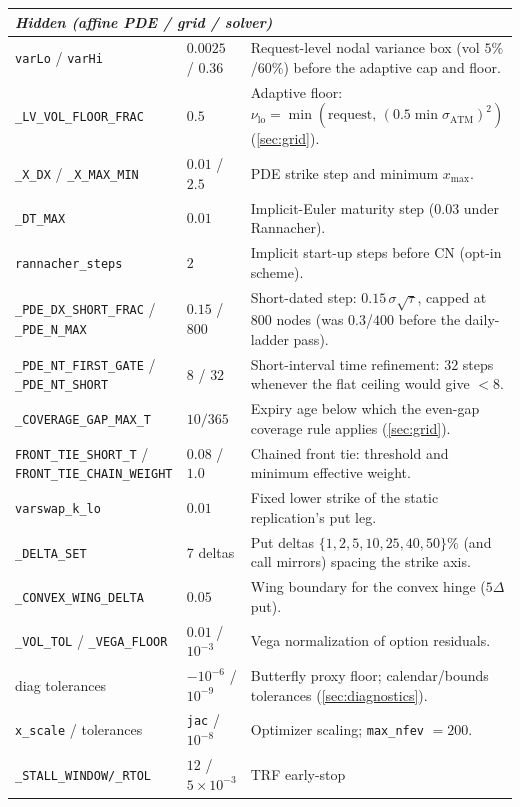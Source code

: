 \documentclass[11pt]{article}
\begin{document}
\begin{longtable}{p{}p{}p{}}
\midrule
\multicolumn{3}{l}{\emph{Hidden (affine PDE / grid / solver)}}\\ \midrule
\texttt{varLo} / \texttt{varHi} & $0.0025$ / $0.36$ & Request-level nodal
variance box (vol $5\%$/$60\%$) before the adaptive cap and floor.\\
\texttt{\_LV\_VOL\_FLOOR\_FRAC} & $0.5$ & Adaptive floor:
$\nu_{\mathrm{lo}}=\min(\text{request},\,(0.5\min\sigma_{\mathrm{ATM}})^{2})$
(\cref{sec:grid}).\\
\texttt{\_X\_DX} / \texttt{\_X\_MAX\_MIN} & $0.01$ / $2.5$ & PDE strike
step and minimum $x_{\max}$.\\
\texttt{\_DT\_MAX} & $0.01$ & Implicit-Euler maturity step ($0.03$ under
Rannacher).\\
\texttt{rannacher\_steps} & $2$ & Implicit start-up steps before CN
(opt-in scheme).\\
\texttt{\_PDE\_DX\_SHORT\_FRAC} / \texttt{\_PDE\_N\_MAX} & $0.15$ / $800$ &
Short-dated step: $0.15\,\sigma\sqrt\tau$, capped at $800$ nodes (was
$0.3$/$400$ before the daily-ladder pass).\\
\texttt{\_PDE\_NT\_FIRST\_GATE} / \texttt{\_PDE\_NT\_SHORT} & $8$ / $32$ &
Short-interval time refinement: $32$ steps whenever the flat ceiling would
give $<8$.\\
\texttt{\_COVERAGE\_GAP\_MAX\_T} & $10/365$ & Expiry age below which the
even-gap coverage rule applies (\cref{sec:grid}).\\
\texttt{FRONT\_TIE\_SHORT\_T} / \texttt{FRONT\_TIE\_CHAIN\_WEIGHT} & $0.08$
/ $1.0$ & Chained front tie: threshold and minimum effective weight.\\
\texttt{varswap\_k\_lo} & $0.01$ & Fixed lower strike of the static
replication's put leg.\\
\texttt{\_DELTA\_SET} & 7 deltas & Put deltas $\{1,2,5,10,25,40,50\}\%$
(and call mirrors) spacing the strike axis.\\
\texttt{\_CONVEX\_WING\_DELTA} & $0.05$ & Wing boundary for the convex
hinge ($5\Delta$ put).\\
\texttt{\_VOL\_TOL} / \texttt{\_VEGA\_FLOOR} & $0.01$ / $10^{-3}$ & Vega
normalization of option residuals.\\
diag tolerances & $-10^{-6}$ / $10^{-9}$ & Butterfly proxy floor;
calendar/bounds tolerances (\cref{sec:diagnostics}).\\
\texttt{x\_scale} / tolerances & \texttt{jac} / $10^{-8}$ & Optimizer
scaling; \texttt{max\_nfev} $=200$.\\
\texttt{\_STALL\_WINDOW/\_RTOL} & $12$ / $5\times10^{-3}$ & TRF early-stop

\end{longtable}
\end{document}
